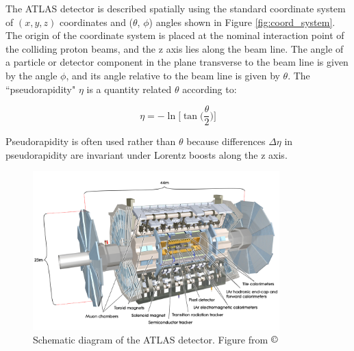 The ATLAS detector is described spatially using the standard coordinate system of \((x,y,z)\) coordinates and (\(\theta\), \(\phi\)) angles shown in Figure \ref{fig:coord_system}. The origin of the coordinate system is placed at the nominal interaction point of the colliding proton beams, and the z axis lies along the beam line. The angle of a particle or detector component in the plane transverse to the beam line is given by the angle \(\phi\), and its angle relative to the beam line is given by \(\theta\). The ``pseudorapidity" \(\eta\) is a quantity related \(\theta\) according to:

\begin{equation}
\label{eq:pseudorapidity}
\eta=-\ln\Big[\tan\Big(\frac{\theta}{2}\Big)\Big]
\end{equation}

Pseudorapidity is often used rather than \(\theta\) because differences \(\Delta\eta\) in pseudorapidity are invariant under Lorentz boosts along the z axis.

\begin{figure}[H]
	\centering
	\includegraphics[width=0.85\textwidth]{Figures/3/detector.jpg}
	\caption[]{Schematic diagram of the ATLAS detector. Figure from \(\copyright\) \cite{atlas}}
	\label{fig:detector}
\end{figure}

